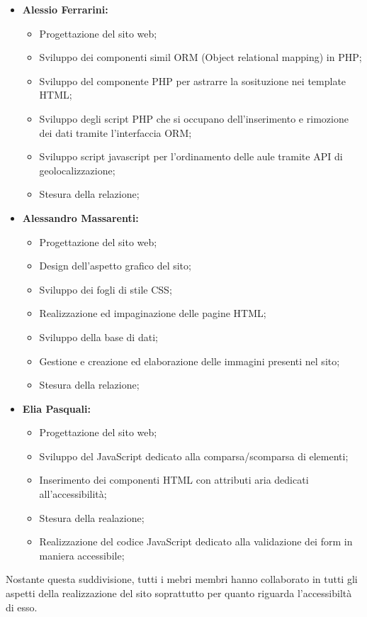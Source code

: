 \begin{itemize}
    \item \textbf{Alessio Ferrarini:}
        \begin{itemize}
            \item Progettazione del sito web;
            \item Sviluppo dei componenti simil ORM (Object relational mapping) in PHP;
            \item Sviluppo del componente PHP per astrarre la sosituzione nei template HTML;
            \item Sviluppo degli script PHP che si occupano dell'inserimento e rimozione dei dati tramite l'interfaccia ORM;
            \item Sviluppo script javascript per l'ordinamento delle aule tramite API di geolocalizzazione;
            \item Stesura della relazione;
        \end{itemize}
    \item \textbf{Alessandro Massarenti:}
        \begin{itemize}
            \item Progettazione del sito web;
            \item Design dell'aspetto grafico del sito;
            \item Sviluppo dei fogli di stile CSS;
            \item Realizzazione ed impaginazione delle pagine HTML;
            \item Sviluppo della base di dati;
            \item Gestione e creazione ed elaborazione delle immagini presenti nel sito;
            \item Stesura della relazione;
        \end{itemize}
    \item \textbf{Elia Pasquali:}
        \begin{itemize}
            \item Progettazione del sito web;
            \item Sviluppo del JavaScript dedicato alla comparsa/scomparsa di elementi;
            \item Inserimento dei componenti HTML con attributi aria dedicati all'accessibilità;
            \item Stesura della realazione;
            \item Realizzazione del codice JavaScript dedicato alla validazione dei form in maniera accessibile;
        \end{itemize}
\end{itemize}

Nostante questa suddivisione, tutti i mebri membri hanno collaborato in tutti gli aspetti della realizzazione del sito soprattutto per quanto riguarda l'accessibiltà di esso.